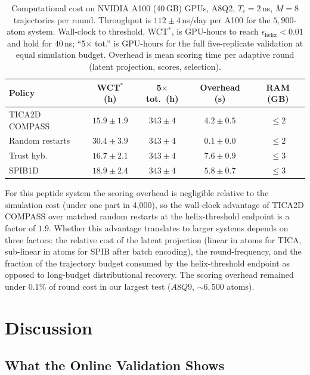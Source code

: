 \documentclass[journal=jctcce,manuscript=article,layout=twocolumn]{achemso}
\begin{document}
\begin{table}[htbp]
    \centering
    \caption{Computational cost on NVIDIA A100 (40\,GB) GPUs, A8Q2, $T_c=2$\,ns, $M=8$ trajectories per round. Throughput is $112\pm 4$\,ns/day per A100 for the $5{,}900$-atom system. Wall-clock to threshold, WCT$^*$, is GPU-hours to reach $\epsilon_{\mathrm{helix}}<0.01$ and hold for $40$\,ns; ``5$\times$ tot.'' is GPU-hours for the full five-replicate validation at equal simulation budget. Overhead is mean scoring time per adaptive round (latent projection, scores, selection).}
    \label{tab:cost}
    \small
    \setlength{\tabcolsep}{3.5pt}
    \begin{tabular}{@{}lcccc@{}}
        \toprule
        Policy & WCT$^*$ (h) & 5$\times$ tot.\ (h) & Overhead (s) & RAM (GB) \\
        \midrule
        TICA2D COMPASS & $15.9\pm 1.9$ & $343\pm 4$ & $4.2\pm 0.5$ & $\leq 2$ \\
        Random restarts & $30.4\pm 3.9$ & $343\pm 4$ & $0.1\pm 0.0$ & $\leq 2$ \\
        Trust hyb. & $16.7\pm 2.1$ & $343\pm 4$ & $7.6\pm 0.9$ & $\leq 3$ \\
        SPIB1D & $18.9\pm 2.4$ & $343\pm 4$ & $5.8\pm 0.7$ & $\leq 3$ \\
        \bottomrule
    \end{tabular}
\end{table}

For this peptide system the scoring overhead is negligible relative to the simulation cost (under one part in 4{,}000), so the wall-clock advantage of TICA2D COMPASS over matched random restarts at the helix-threshold endpoint is a factor of $1.9$. Whether this advantage translates to larger systems depends on three factors: the relative cost of the latent projection (linear in atoms for TICA, sub-linear in atoms for SPIB after batch encoding), the round-frequency, and the fraction of the trajectory budget consumed by the helix-threshold endpoint as opposed to long-budget distributional recovery. The scoring overhead remained under $0.1\%$ of round cost in our largest test ($A8Q9$, $\sim 6{,}500$ atoms).

\section{Discussion}

\subsection{What the Online Validation Shows}
\end{document}

